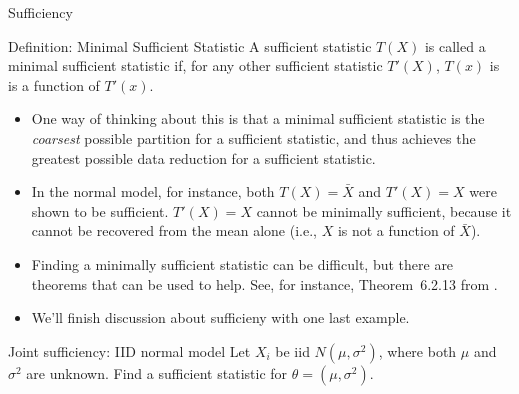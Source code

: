 \begin{frame}[allowframebreaks]{Sufficiency}
\framebreak

\begin{block}{Definition: Minimal Sufficient Statistic}
  A sufficient statistic $T(X)$ is called a \alert{minimal sufficient statistic} if, for any other sufficient statistic $T'(X)$, $T(x)$ is is a function of $T'(x)$.
\end{block}

\begin{itemize}
  \item One way of thinking about this is that a minimal sufficient statistic is the \emph{coarsest} possible partition for a sufficient statistic, and thus achieves the greatest possible data reduction for a sufficient statistic.
  \item In the normal model, for instance, both $T(X) = \bar{X}$ and $T'(X) = X$ were shown to be sufficient. $T'(X) = X$ \alert{cannot} be minimally sufficient, because it cannot be recovered from the mean alone (i.e., $X$ is not a function of $\bar{X}$).

  \framebreak

  \item Finding a minimally sufficient statistic can be difficult, but there are theorems that can be used to help. See, for instance, Theorem~6.2.13 from \citet{casella24}.
  \item We'll finish discussion about sufficieny with one last example.
\end{itemize}

\begin{exampleblock}{Joint sufficiency: IID normal model}
  Let $X_i$ be iid $N(\mu, \sigma^2)$, where both $\mu$ and $\sigma^2$ are unknown. Find a sufficient statistic for $\theta = (\mu, \sigma^2)$.

\end{exampleblock}
\end{frame}
